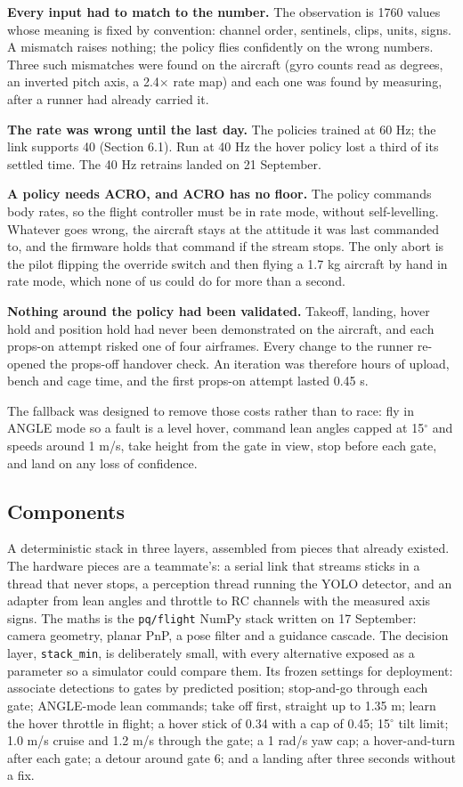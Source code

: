 \documentclass{article}
\begin{document}
\textbf{Every input had to match to the number.} The observation is 1760 values whose meaning is fixed by convention: channel order, sentinels, clips, units, signs. A mismatch raises nothing; the policy flies confidently on the wrong numbers. Three such mismatches were found on the aircraft (gyro counts read as degrees, an inverted pitch axis, a 2.4$\times$ rate map) and each one was found by measuring, after a runner had already carried it.

\textbf{The rate was wrong until the last day.} The policies trained at 60 Hz; the link supports 40 (Section 6.1). Run at 40 Hz the hover policy lost a third of its settled time. The 40 Hz retrains landed on 21 September.

\textbf{A policy needs ACRO, and ACRO has no floor.} The policy commands body rates, so the flight controller must be in rate mode, without self-levelling. Whatever goes wrong, the aircraft stays at the attitude it was last commanded to, and the firmware holds that command if the stream stops. The only abort is the pilot flipping the override switch and then flying a 1.7 kg aircraft by hand in rate mode, which none of us could do for more than a second.

\textbf{Nothing around the policy had been validated.} Takeoff, landing, hover hold and position hold had never been demonstrated on the aircraft, and each props-on attempt risked one of four airframes. Every change to the runner re-opened the props-off handover check. An iteration was therefore hours of upload, bench and cage time, and the first props-on attempt lasted 0.45 s.

The fallback was designed to remove those costs rather than to race: fly in ANGLE mode so a fault is a level hover, command lean angles capped at 15$^\circ$ and speeds around 1 m/s, take height from the gate in view, stop before each gate, and land on any loss of confidence.

\subsection{Components}
A deterministic stack in three layers, assembled from pieces that already existed. The hardware pieces are a teammate's: a serial link that streams sticks in a thread that never stops, a perception thread running the YOLO detector, and an adapter from lean angles and throttle to RC channels with the measured axis signs. The maths is the \texttt{pq/flight} NumPy stack written on 17 September: camera geometry, planar PnP, a pose filter and a guidance cascade. The decision layer, \texttt{stack\_min}, is deliberately small, with every alternative exposed as a parameter so a simulator could compare them. Its frozen settings for deployment: associate detections to gates by predicted position; stop-and-go through each gate; ANGLE-mode lean commands; take off first, straight up to 1.35 m; learn the hover throttle in flight; a hover stick of 0.34 with a cap of 0.45; 15$^\circ$ tilt limit; 1.0 m/s cruise and 1.2 m/s through the gate; a 1 rad/s yaw cap; a hover-and-turn after each gate; a detour around gate 6; and a landing after three seconds without a fix.
\end{document}
